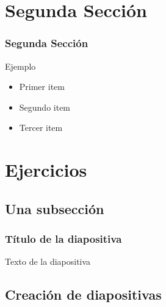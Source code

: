 \documentclass{beamer}
\begin{document}
\section{Segunda Sección}

\begin{frame}

\frametitle{Segunda Sección}

\begin{block}{Ejemplo}
  \begin{itemize}
  \item
  Primer item 
  \pause

  \item
  Segundo item
  \pause

  \item
  Tercer item

  \end{itemize}
\end{block}

\end{frame}

\section{Ejercicios}

\subsection{Una subsección}
\begin{frame}
\frametitle{Título de la diapositiva}

Texto de la diapositiva
\end{frame}

\subsection{Creación de diapositivas}
\end{document}
